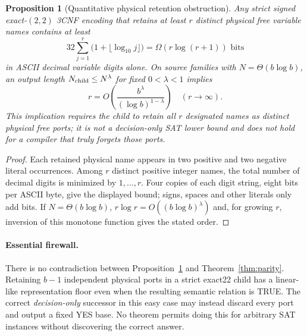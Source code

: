 \documentclass[11pt]{article}
\newtheorem{proposition}[theorem]{Proposition}
\begin{document}
\begin{proposition}[Quantitative physical retention obstruction]\label{prop:floor}
Any strict signed exact-$(2,2)$ 3CNF encoding that retains at least $r$ distinct physical free variable names contains at least
\[
\boxed{32\sum_{j=1}^{r}\bigl(1+\lfloor\log_{10}j\rfloor\bigr)=\Omega(r\log(r+1))\text{ bits}}
\]
in ASCII decimal variable digits alone. On source families with $N=\Theta(b\log b)$, an output length $N_{\rm child}\le N^\lambda$ for fixed $0<\lambda<1$ implies
\[
 r=O\!\left(\frac{b^\lambda}{(\log b)^{1-\lambda}}\right)
\quad (r\to\infty).
\]
This implication requires the child to retain all $r$ designated names as distinct physical free ports; it is \emph{not} a decision-only SAT lower bound and does not hold for a compiler that truly forgets those ports.
\end{proposition}
\begin{proof}
Each retained physical name appears in two positive and two negative literal occurrences. Among $r$ distinct positive integer names, the total number of decimal digits is minimized by $1,\ldots,r$. Four copies of each digit string, eight bits per ASCII byte, give the displayed bound; signs, spaces and other literals only add bits. If $N=\Theta(b\log b)$, $r\log r=O((b\log b)^\lambda)$ and, for growing $r$, inversion of this monotone function gives the stated order.\end{proof}

\paragraph{Essential firewall.} There is no contradiction between Proposition~\ref{prop:floor} and Theorem~\ref{thm:parity}. Retaining $b-1$ independent physical ports in a strict exact22 child has a linear-like representation floor even when the resulting semantic relation is TRUE. The correct \emph{decision-only} successor in this easy case may instead discard every port and output a fixed YES base. No theorem permits doing this for arbitrary SAT instances without discovering the correct answer.
\end{document}
